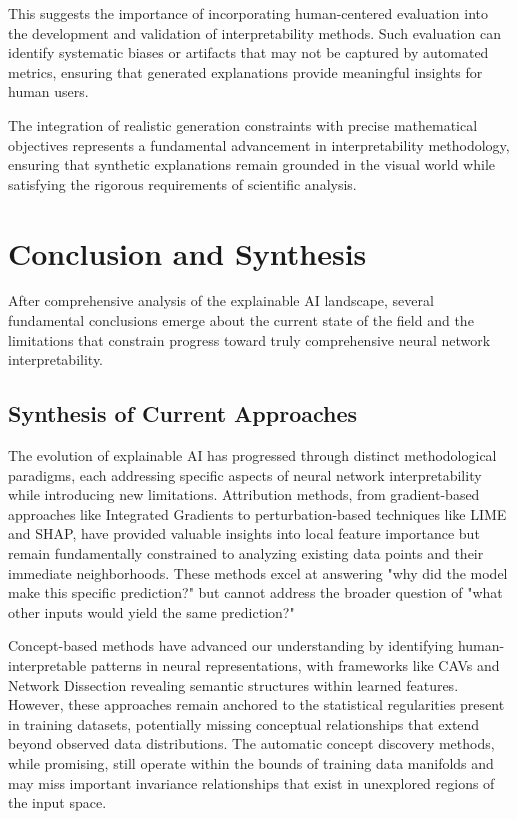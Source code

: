 This suggests the importance of incorporating human-centered evaluation into the development and validation of interpretability methods. Such evaluation can identify systematic biases or artifacts that may not be captured by automated metrics, ensuring that generated explanations provide meaningful insights for human users.

The integration of realistic generation constraints with precise mathematical objectives represents a fundamental advancement in interpretability methodology, ensuring that synthetic explanations remain grounded in the visual world while satisfying the rigorous requirements of scientific analysis.

\section{Conclusion and Synthesis}

After comprehensive analysis of the explainable AI landscape, several fundamental conclusions emerge about the current state of the field and the limitations that constrain progress toward truly comprehensive neural network interpretability.

\subsection{Synthesis of Current Approaches}

The evolution of explainable AI has progressed through distinct methodological paradigms, each addressing specific aspects of neural network interpretability while introducing new limitations. Attribution methods, from gradient-based approaches like Integrated Gradients to perturbation-based techniques like LIME and SHAP, have provided valuable insights into local feature importance but remain fundamentally constrained to analyzing existing data points and their immediate neighborhoods. These methods excel at answering "why did the model make this specific prediction?" but cannot address the broader question of "what other inputs would yield the same prediction?"

Concept-based methods have advanced our understanding by identifying human-interpretable patterns in neural representations, with frameworks like CAVs and Network Dissection revealing semantic structures within learned features. However, these approaches remain anchored to the statistical regularities present in training datasets, potentially missing conceptual relationships that extend beyond observed data distributions. The automatic concept discovery methods, while promising, still operate within the bounds of training data manifolds and may miss important invariance relationships that exist in unexplored regions of the input space.

